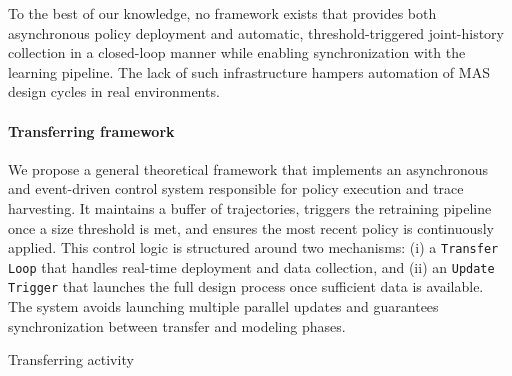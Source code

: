 To the best of our knowledge, no framework exists that provides both asynchronous policy deployment and automatic, threshold-triggered joint-history collection in a closed-loop manner while enabling synchronization with the learning pipeline. The lack of such infrastructure hampers automation of MAS design cycles in real environments.

\paragraph{Transferring framework}
We propose a general theoretical framework that implements an asynchronous and event-driven control system responsible for policy execution and trace harvesting. It maintains a buffer of trajectories, triggers the retraining pipeline once a size threshold is met, and ensures the most recent policy is continuously applied. This control logic is structured around two mechanisms:
(i) a \texttt{Transfer Loop} that handles real-time deployment and data collection, and
(ii) an \texttt{Update Trigger} that launches the full design process once sufficient data is available. The system avoids launching multiple parallel updates and guarantees synchronization between transfer and modeling phases.

\vspace{-0.3em}
\begin{algorithm}[H]
    \caption{Transferring activity}
    \label{alg:transferring}
    \DontPrintSemicolon
    
    \vspace{0.3em}
\end{algorithm}

